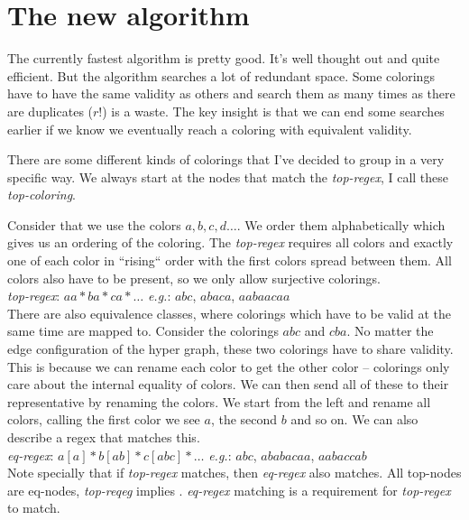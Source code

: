 \documentclass{article}
\begin{document}
\section{The new algorithm}
The currently fastest algorithm is pretty good.
It's well thought out and quite efficient.
But the algorithm searches a lot of redundant space.
Some colorings have to have the same validity as others and search them as many times as there are duplicates ($r!$) is a waste.
The key insight is that we can end some searches earlier if we know we eventually reach a coloring with equivalent validity.


There are some different kinds of colorings that I've decided to group in a very specific way.
We always start at the nodes that match the \textit{top-regex}, I call these \textit{top-coloring}.

Consider that we use the colors $a, b, c, d \dots$. We order them alphabetically which gives us an ordering of the coloring.
The \textit{top-regex} requires all colors and exactly one of each color in ``rising`` order with the first colors spread between them.
All colors also have to be present, so we only allow surjective colorings.
\\
\textit{top-regex}: $aa*ba*ca*\dots$ \hspace{1em} \textit{e.g.}: $abc$, $abaca$, $aabaacaa$
\\
There are also equivalence classes, where colorings which have to be valid at the same time are mapped to.
Consider the colorings $abc$ and $cba$. No matter the edge configuration of the hyper graph, these two colorings have to share validity.
This is because we can rename each color to get the other color -- colorings only care about the internal equality of colors.
We can then send all of these to their representative by renaming the colors. We start from the left and rename all colors, calling
the first color we see $a$, the second $b$ and so on. We can also describe a regex that matches this.
\\
\textit{eq-regex}: $a[a]*b[ab]*c[abc]*\dots$ \hspace{1em} \textit{e.g.}: $abc$, $ababacaa$, $aabaccab$
\\
Note specially that if \textit{top-regex} matches, then \textit{eq-regex} also matches. All top-nodes are eq-nodes, \textit{top-reqeg} implies .
\textit{eq-regex} matching is a requirement for \textit{top-regex} to match.
\end{document}
